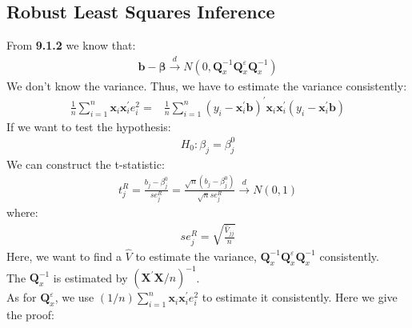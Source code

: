 \documentclass{article}
\begin{document}
\subsection{Robust Least Squares Inference}
From \textbf{9.1.2} we know that:
	\begin{align*}
		\boldsymbol{b} - \boldsymbol{\beta} \xrightarrow{d} N(0, \boldsymbol{Q}^{-1}_x \boldsymbol{Q}^\varepsilon_x \boldsymbol{Q}^{-1}_x)
	\end{align*}
We don't know the variance. Thus, we have to estimate the variance consistently:
	\begin{align*}
		\frac{1}{n} \sum^n_{i=1} \boldsymbol{x}_i \boldsymbol{x}^\prime_i e^2_i = &\frac{1}{n} \sum^n_{i=1} (y_i - \boldsymbol{x}^\prime_i \boldsymbol{b})^\prime \boldsymbol{x}_i \boldsymbol{x}^\prime_i (y_i - \boldsymbol{x}^\prime_i \boldsymbol{b})
	\end{align*} 
If we want to test the hypothesis:
	\begin{align*}
		H_0: \beta_j = \beta^0_j
	\end{align*}
We can construct the t-statistic:
	\begin{align*}
		t^R_j = \frac{b_j - \beta^0_j}{se^R_j} = \frac{\sqrt{n}(b_j - \beta^0_j)}{\sqrt{n}se^R_j} \xrightarrow{d} N(0, 1) 
	\end{align*}
where:
	\begin{align*}
		se^R_j = \sqrt{\frac{\hat{V}_{jj}}{n}}
	\end{align*}
Here, we want to find a $\hat{V}$ to estimate the variance, $\boldsymbol{Q}^{-1}_x \boldsymbol{Q}^\varepsilon_x \boldsymbol{Q}^{-1}_x$ consistently.\\
The $\boldsymbol{Q}^{-1}_x$ is estimated by $(\boldsymbol{X}^\prime \boldsymbol{X} / n)^{-1}$.\\
As for $\boldsymbol{Q}^\varepsilon_x$, we use $(1/n) \sum^n_{i=1} \boldsymbol{x}_i \boldsymbol{x}^\prime_i e^2_i$ to estimate it consistently. Here we give the proof:
\end{document}
